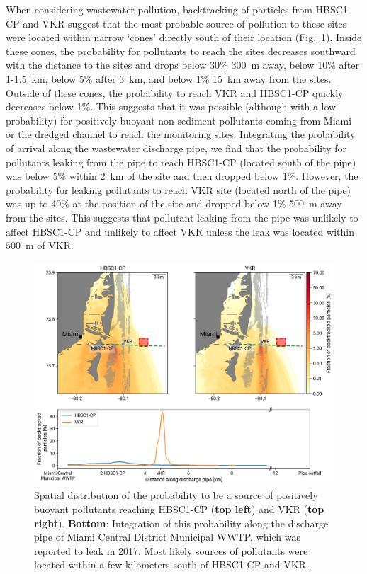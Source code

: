 \documentclass[preprint,12pt,authoryear]{elsarticle}
\begin{document}
When considering wastewater pollution, backtracking of particles from HBSC1-CP and VKR suggest that the most probable source of pollution to these sites were located within narrow `cones' directly south of their location (Fig.~\ref{fig:backtrack}). Inside these cones, the probability for pollutants to reach the sites decreases southward with the distance to the sites and drops below 30\% 300~m away, below 10\% after 1-1.5~km, below 5\% after 3~km, and below 1\%  15~km away from the sites. Outside of these cones, the probability to reach VKR and HBSC1-CP quickly decreases below 1\%. This suggests that it was possible (although with a low probability) for positively buoyant non-sediment pollutants coming from Miami or the dredged channel to reach the monitoring sites. Integrating the probability of arrival along the wastewater discharge pipe, we find that the probability for pollutants leaking from the pipe to reach HBSC1-CP (located south of the pipe) was below 5\% within 2~km of the site and then dropped below 1\%. However, the probability for leaking pollutants to reach VKR site (located north of the pipe) was up to 40\% at the position of the site and dropped below 1\% 500~m away from the sites. This suggests that pollutant leaking from the pipe was unlikely to affect HBSC1-CP and unlikely to affect VKR unless the leak was located within $500$~m of VKR.

\begin{figure}
    \centering
    \includegraphics[width=.98\textwidth]{figures/fig_proba_stokes_v2.png}
    \caption{Spatial distribution of the probability to be a source of positively buoyant pollutants reaching HBSC1-CP (\textbf{top left}) and VKR (\textbf{top right}). \textbf{Bottom}: Integration of this probability along the discharge pipe of Miami Central District Municipal WWTP, which was reported to leak in 2017. Most likely sources of pollutants were located within a few kilometers south of HBSC1-CP and VKR.}
    \label{fig:backtrack}
\end{figure}
\end{document}
